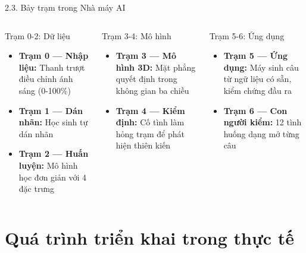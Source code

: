 \documentclass[10pt, aspectratio=169]{beamer}
\begin{document}
\begin{frame}{2.3. Bảy trạm trong Nhà máy AI}
    \begin{columns}
        \begin{block}{Trạm 0-2: Dữ liệu}
            \begin{itemize}
                \item \textbf{Trạm 0 — Nhập liệu:} Thanh trượt điều chỉnh ánh sáng (0-100\%)
                \item \textbf{Trạm 1 — Dán nhãn:} Học sinh tự dán nhãn
                \item \textbf{Trạm 2 — Huấn luyện:} Mô hình học đơn giản với 4 đặc trưng
            \end{itemize}
        \end{block}
        \begin{block}{Trạm 3-4: Mô hình}
            \begin{itemize}
                \item \textbf{Trạm 3 — Mô hình 3D:} Mặt phẳng quyết định trong không gian ba chiều
                \item \textbf{Trạm 4 — Kiểm định:} Cố tình làm hỏng trạm để phát hiện thiên kiến
            \end{itemize}
        \end{block}
        \begin{block}{Trạm 5-6: Ứng dụng}
            \begin{itemize}
                \item \textbf{Trạm 5 — Ứng dụng:} Máy sinh câu từ ngữ liệu có sẵn, kiểm chứng đầu ra
                \item \textbf{Trạm 6 — Con người kiểm:} 12 tình huống dạng mở từng câu
            \end{itemize}
        \end{block}
    \end{columns}
\end{frame}

\section{Quá trình triển khai trong thực tế}
\end{document}
